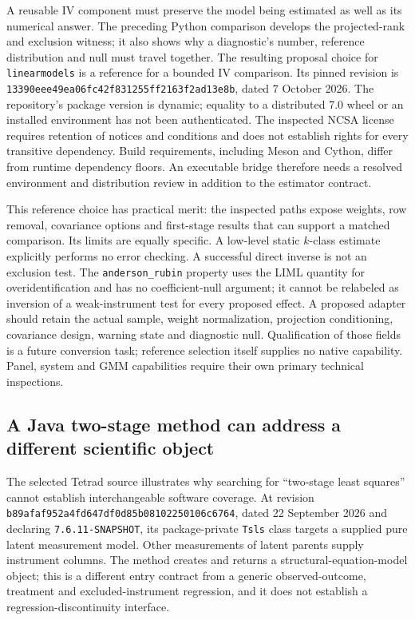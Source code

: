 A reusable IV component must preserve the model being estimated as well as its
numerical answer. The preceding Python comparison develops the projected-rank
and exclusion witness; it also shows why a diagnostic's number, reference
distribution and null must travel together. The resulting proposal choice for
\texttt{linearmodels} is a reference for a bounded IV comparison. Its pinned
revision is \texttt{13390eee49ea06fc42f831255ff2163f2ad13e8b}, dated
7 October 2026. The repository's package version is dynamic; equality to a
distributed 7.0 wheel or an installed environment has not been authenticated.
The inspected NCSA license requires retention of notices and conditions and
does not establish rights for every transitive dependency. Build requirements,
including Meson and Cython, differ from runtime dependency floors. An executable
bridge therefore needs a resolved environment and distribution review in
addition to the estimator contract.~\citep{exec22_linearmodels_reuse}

This reference choice has practical merit: the inspected paths expose weights,
row removal, covariance options and first-stage results that can support a
matched comparison. Its limits are equally specific. A low-level static
$k$-class estimate explicitly performs no error checking. A successful direct
inverse is not an exclusion test. The \texttt{anderson\_rubin} property uses
the LIML quantity for overidentification and has no coefficient-null argument;
it cannot be relabeled as inversion of a weak-instrument test for every
proposed effect. A proposed adapter should retain the actual sample, weight
normalization, projection conditioning, covariance design, warning state and
diagnostic null. Qualification of those fields is a future conversion task;
reference selection itself supplies no native capability. Panel, system and
GMM capabilities require their own primary technical inspections.
\citep{exec22_linearmodels_reuse}

\subsection{A Java two-stage method can address a different scientific object}
\label{exec23:iv-java}

The selected Tetrad source illustrates why searching for ``two-stage least
squares'' cannot establish interchangeable software coverage. At revision
\texttt{b89afaf952a4fd647df0}\allowbreak\texttt{d85b08102250106c6764}, dated 22 September 2026
and declaring \texttt{7.6.11-SNAPSHOT}, its package-private \texttt{Tsls}
class targets a supplied pure latent measurement model. Other measurements of
latent parents supply instrument columns. The method creates and returns a
structural-equation-model object; this is a different entry contract from a
generic observed-outcome, treatment and excluded-instrument regression, and
it does not establish a regression-discontinuity interface.
\citep{exec22_java_latent_iv_preflight}

